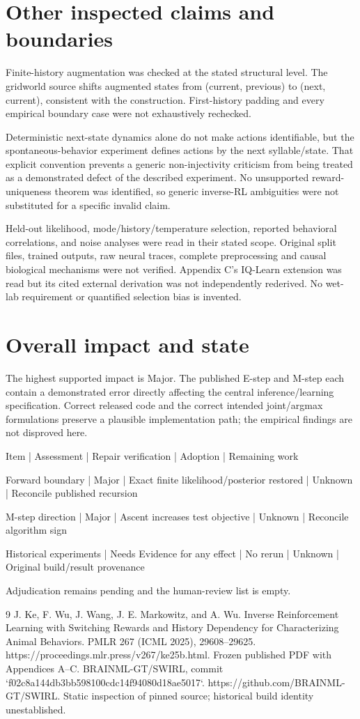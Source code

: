\documentclass[10pt]{article}
\begin{document}
\section*{Other inspected claims and boundaries}
Finite-history augmentation was checked at the stated structural level. The gridworld source shifts augmented states from (current, previous) to (next, current), consistent with the construction. First-history padding and every empirical boundary case were not exhaustively rechecked.\par
Deterministic next-state dynamics alone do not make actions identifiable, but the spontaneous-behavior experiment defines actions by the next syllable/state. That explicit convention prevents a generic non-injectivity criticism from being treated as a demonstrated defect of the described experiment. No unsupported reward-uniqueness theorem was identified, so generic inverse-RL ambiguities were not substituted for a specific invalid claim.\par
Held-out likelihood, mode/history/temperature selection, reported behavioral correlations, and noise analyses were read in their stated scope. Original split files, trained outputs, raw neural traces, complete preprocessing and causal biological mechanisms were not verified. Appendix C’s IQ-Learn extension was read but its cited external derivation was not independently rederived. No wet-lab requirement or quantified selection bias is invented.\par
\section*{Overall impact and state}
The highest supported impact is Major. The published E-step and M-step each contain a demonstrated error directly affecting the central inference/learning specification. Correct released code and the correct intended joint/argmax formulations preserve a plausible implementation path; the empirical findings are not disproved here.\par
Item | Assessment | Repair verification | Adoption | Remaining work\par
Forward boundary | Major | Exact finite likelihood/posterior restored | Unknown | Reconcile published recursion\par
M-step direction | Major | Ascent increases test objective | Unknown | Reconcile algorithm sign\par
Historical experiments | Needs Evidence for any effect | No rerun | Unknown | Original build/result provenance\par
Adjudication remains pending and the human-review list is empty.\par
9 J. Ke, F. Wu, J. Wang, J. E. Markowitz, and A. Wu. Inverse Reinforcement Learning with Switching Rewards and History Dependency for Characterizing Animal Behaviors. PMLR 267 (ICML 2025), 29608–29625. https://proceedings.mlr.press/v267/ke25b.html. Frozen published PDF with Appendices A–C. BRAINML-GT/SWIRL, commit `f02c8a144db3bb598100cdc14f94080d18ae5017`. https://github.com/BRAINML-GT/SWIRL. Static inspection of pinned source; historical build identity unestablished.\par
\end{document}

